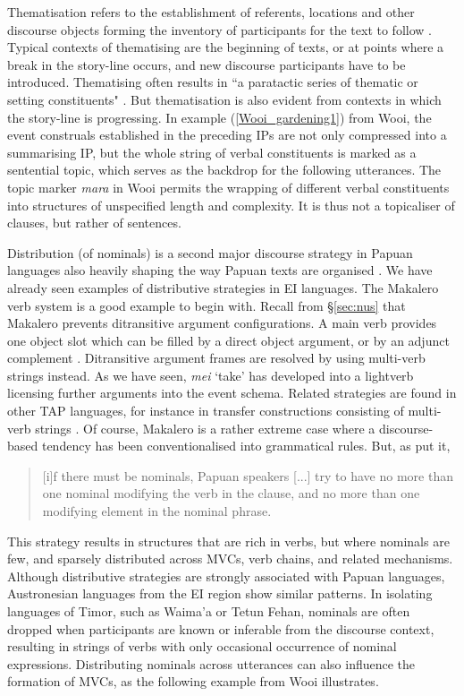 Thematisation refers to the establishment of referents, locations and other discourse objects forming the inventory of participants for the text to follow \citep{heeschen1998eipo, devries2006areal}. Typical contexts of thematising are the beginning of texts, or at points where a break in the story-line occurs, and new discourse participants have to be introduced. Thematising often results in ``a paratactic series of thematic or setting constituents" \citep[814]{devries2006areal}. But thematisation is also evident from contexts  in which the story-line is progressing. In example (\ref{Wooi_gardening1}) from Wooi, the event construals established in the preceding IPs are not only compressed into a summarising IP, but the whole string of verbal constituents is marked as a sentential topic, which serves as the backdrop for the following utterances. The topic marker \textit{mara} in Wooi permits the wrapping of different verbal constituents into structures of unspecified length and complexity. It is thus not a topicaliser of clauses, but rather of sentences.

Distribution (of nominals) is a second major discourse strategy in Papuan languages also heavily shaping the way Papuan texts are organised \citep{devries2005towards, devries2006areal}. We have already seen examples of distributive strategies in EI languages. The Makalero verb system is a good example to begin with. Recall from §\ref{sec:nus} that Makalero prevents ditransitive argument configurations. A main verb provides one object slot which can be filled by a direct object argument, or by an adjunct complement \citep{huber2011}. Ditransitive argument frames are resolved by using multi-verb strings instead. As we have seen, \textit{mei} `take' has developed into a lightverb licensing further arguments into the event schema. Related strategies are found in other TAP languages, for instance in transfer constructions consisting of multi-verb strings \citep{klamer2012development}. Of course, Makalero is a rather extreme case where a discourse-based tendency has been conventionalised into grammatical rules. But, as \citet[813]{devries2006areal} put it, \begin{quote}[i]f there must be nominals, Papuan speakers [...] try to have no more than one nominal modifying the verb in the clause, and no more than one modifying element in the nominal phrase.\end{quote} This strategy results in structures that are rich in verbs, but where nominals are few, and sparsely distributed across MVCs, verb chains, and related mechanisms. Although distributive strategies are strongly associated with Papuan languages, Austronesian languages from the EI region show similar patterns. In isolating languages of Timor, such as Waima'a or Tetun Fehan, nominals are often dropped when participants are known or inferable from the discourse context, resulting in strings of verbs with only occasional occurrence of nominal expressions. Distributing nominals across utterances can also influence the formation of MVCs, as the following example from Wooi illustrates.

